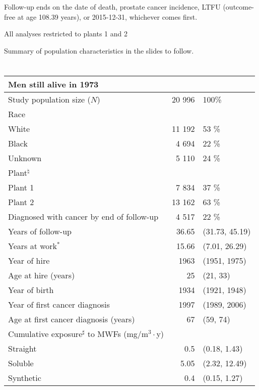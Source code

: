 \documentclass[10pt,]{article}
\begin{document}
Follow-up ends on the date of death, prostate cancer incidence, LTFU
(outcome-free at age 108.39 years), or 2015-12-31, whichever comes
first.

All analyses restricted to plants 1 and 2

Summary of population characteristics in the slides to follow.

\hypertarget{section}{%
\section{}\label{section}}

\begin{table}[H]
\centering
\begin{tabular}{lrl}
  \toprule
\multicolumn{3}{l}{Men still alive in 1973}\\%
  \midrule
Study population size ($N$) & 20 996 & 100\% \\ 
  Race &  &  \\ 
  \hspace{10pt}White & 11 192 & 53 \% \\ 
  \hspace{10pt}Black & 4 694 & 22 \% \\ 
  \hspace{10pt}Unknown & 5 110 & 24 \% \\ 
  Plant$^\natural$ &  &  \\ 
  \hspace{10pt}Plant 1 & 7 834 & 37 \% \\ 
  \hspace{10pt}Plant 2 & 13 162 & 63 \% \\ 
  Diagnosed with cancer by end of follow-up & 4 517 & 22 \% \\ 
  \hline Years of follow-up & 36.65 & (31.73, 45.19) \\ 
  Years at work$^*$ & 15.66 & (7.01, 26.29) \\ 
  Year of hire & 1963 & (1951, 1975) \\ 
  Age at hire (years) & 25 & (21, 33) \\ 
  Year of birth & 1934 & (1921, 1948) \\ 
  Year of first cancer diagnosis & 1997 & (1989, 2006) \\ 
  Age at first cancer diagnosis (years) & 67 & (59, 74) \\ 
  Cumulative exposure$^\sharp$ to MWFs (mg/m$^3\cdot$y) &  &  \\ 
  \hspace{10pt}Straight & 0.5 & (0.18, 1.43) \\ 
  \hspace{10pt}Soluble & 5.05 & (2.32, 12.49) \\ 
  \hspace{10pt}Synthetic & 0.4 & (0.15, 1.27) \\ 
   \bottomrule
\end{tabular}
\end{table}
\end{document}

